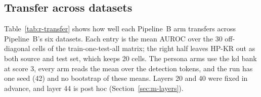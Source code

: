 \subsection{Transfer across datasets}
\label{sec:r-transfer}

Table~\ref{tab:r-transfer} shows how well each Pipeline~B arm transfers across Pipeline~B's six datasets. %
Each entry is the mean AUROC over the 30 off-diagonal cells of the train-one-test-all matrix; the right half leaves HP-KR out as both source and test set, which keeps 20 cells. %
The persona arms use the kd bank at score 3, every arm reads the mean over the detection tokens, and the run has one seed (42) and no bootstrap of these means. %
Layers 20 and 40 were fixed in advance, and layer 44 is post hoc (Section~\ref{sec:m-layers}). %

